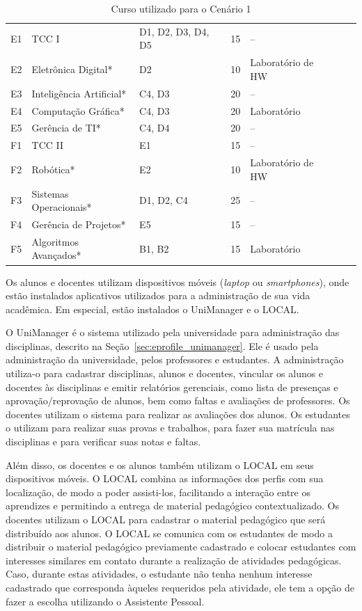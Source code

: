 \begin{table}
\begin{tabular*}{1\textwidth}{@{}lllllll@{}}
    \midrule
    E1 & TCC I                  & D1, D2, D3, D4, D5 & 15 & -- \\
    E2 & Eletrônica Digital*    & D2 & 10 & Laboratório de HW \\
    E3 & Inteligência Artificial* & C4, D3 & 20 & -- \\
    E4 & Computação Gráfica*    & C4, D3 & 20 & Laboratório \\
    E5 & Gerência de TI*        & C4, D4 & 20 & -- \\
    \midrule
    F1 & TCC II                 & E1 & 15 & -- \\
    F2 & Robótica*              & E2 & 10 & Laboratório de HW \\
    F3 & Sistemas Operacionais* & D1, D2, C4 & 25 & -- \\
    F4 & Gerência de Projetos*  & E5 & 15 & -- \\
    F5 & Algoritmos Avançados*  & B1, B2 & 15 & Laboratório \\
    \bottomrule
  \end{tabular*}
  \caption{Curso utilizado para o Cenário 1}
  \label{tab:curso}
\end{table}

Os alunos e docentes utilizam dispositivos móveis ({\em laptop} ou {\em smartphones}), onde estão instalados aplicativos utilizados para a administração de sua vida acadêmica. Em especial, estão instalados o UniManager e o LOCAL.

O UniManager é o sistema utilizado pela universidade para administração das disciplinas, descrito na Seção~\ref{sec:eprofile_unimanager}. Ele é usado pela administração da universidade, pelos professores e estudantes. A administração utiliza-o para cadastrar disciplinas, alunos e docentes,  vincular os alunos e docentes às disciplinas e emitir relatórios gerenciais, como lista de presenças e aprovação/reprovação de alunos, bem como faltas e avaliações de professores. Os docentes utilizam o sistema para realizar as avaliações dos alunos. Os estudantes o utilizam para realizar suas provas e trabalhos, para fazer sua matrícula nas disciplinas e para verificar suas notas e faltas.

Além disso, os docentes e os alunos também utilizam o LOCAL em seus dispositivos móveis. O LOCAL combina as informações dos perfis com sua localização, de modo a poder assisti-los, facilitando a interação entre os aprendizes e permitindo a entrega de material pedagógico contextualizado. Os docentes utilizam o LOCAL para cadastrar o material pedagógico que será distribuído aos alunos. O LOCAL se comunica com os estudantes de modo a distribuir o material pedagógico previamente cadastrado e colocar estudantes com interesses similares em contato durante a realização de atividades pedagógicas. Caso, durante estas atividades, o estudante não tenha nenhum interesse cadastrado que corresponda àqueles requeridos pela atividade, ele tem a opção de fazer a escolha utilizando o Assistente Pessoal. 

